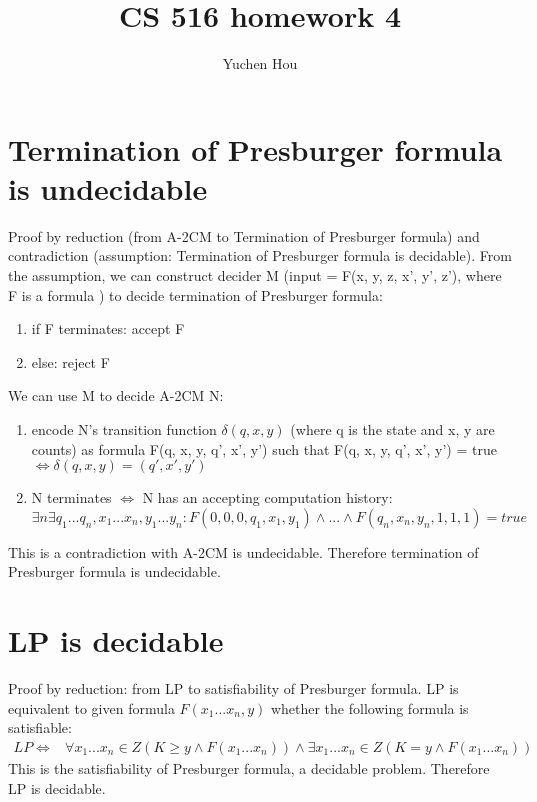 \documentclass{article}
\begin{document}
\lstset{language=python, tabsize=4}
\title{CS 516 homework 4}
\author{Yuchen Hou}
\maketitle

\section{Termination of Presburger formula is undecidable}
Proof by reduction (from A-2CM to Termination of Presburger formula) and 
contradiction (assumption: Termination of Presburger formula is decidable). 
From the assumption, we can construct decider M (input = F(x, y, z, x', y', 
z'), where F is a formula ) to decide termination of Presburger formula:
\begin{enumerate}
	\item if F terminates: accept F
	\item else: reject F
\end{enumerate}
We can use M to decide A-2CM N:
\begin{enumerate}
	\item encode N's transition function $ \delta(q, x, y) $ 
	(where q is the state and x, y are counts) as formula F(q, x, y, q', x', 
	y') such 
	that F(q, x, y, q', x', y') = true $ \iff \delta(q, x, y) = (q', x', y') $
	\item N terminates $ \iff $ N has an accepting computation history: $ 
	\exists n \exists q_1 ... q_n, x_1 ... x_n, y_1 ... y_n : F(0, 0, 0, 
	q_1, x_1, y_1) \land ... \land F(q_n, x_n, y_n, 1, 1, 1) = true$
\end{enumerate}
This is a contradiction with A-2CM is undecidable. Therefore termination of 
Presburger formula is undecidable.

\section{LP is decidable}
Proof by reduction: from LP to satisfiability of Presburger formula. LP is 
equivalent to given formula $ F(x_1 ... x_n, y) $ whether the following formula 
is satisfiable:
\begin{align*}
	LP \iff& \forall x_1 ... x_n \in Z (K \ge y \land F(x_1 ... x_n)) \land 
	\exists x_1 ... x_n \in Z (K = y \land F(x_1 ... x_n) )
\end{align*}
This is the satisfiability of Presburger formula, a decidable problem. 
Therefore LP is decidable.
\end{document}
